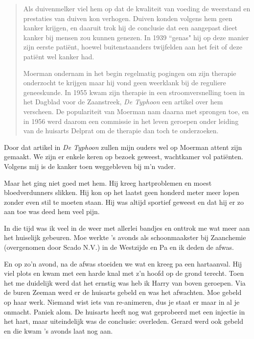 \documentclass[10pt,twoside, openright]{memoir}
\begin{document}
\begin{quote}
Als duivenmelker viel hem op dat de kwaliteit van voeding de weerstand en prestaties van duiven kon verhogen. Duiven konden volgens hem geen kanker krijgen, en daaruit trok hij de conclusie dat een aangepast dieet kanker bij mensen zou kunnen genezen. In 1939 ``genas" hij op deze manier zijn eerste patiënt, hoewel buitenstaanders twijfelden aan het feit of deze patiënt wel kanker had. 

Moerman ondernam in het begin regelmatig pogingen om zijn therapie onderzocht te krijgen maar hij vond geen weerklank bij de reguliere geneeskunde. In 1955 kwam zijn therapie in een stroomversnelling toen in het Dagblad voor de Zaanstreek, \emph{De Typhoon} een artikel over hem verscheen. De populariteit van Moerman nam daarna met sprongen toe, en in 1956 werd daarom een commissie in het leven geroepen onder leiding van de huisarts Delprat om de therapie dan toch te onderzoeken.
\end{quote}

Door dat artikel in \emph{De Typhoon} zullen mijn ouders wel op Moerman attent zijn gemaakt. We zijn er enkele keren op bezoek geweest, wachtkamer vol patiënten. Volgens mij is de kanker toen weggebleven bij m’n vader. 

Maar het ging niet goed met hem. Hij kreeg hartproblemen en moest bloedverdunners slikken. Hij kon op het laatst geen honderd meter meer lopen zonder even stil te moeten staan. Hij was altijd sportief geweest en dat hij er zo aan toe was deed hem veel pijn.

In die tijd was ik veel in de weer met allerlei bandjes en onttrok me wat meer aan het huiselijk gebeuren. Moe werkte ’s avonds als schoonmaakster bij Zaanchemie (overgenomen door Scado N.V.) in de Westzijde en Pa en ik deden de afwas. 

En op zo’n avond, na de afwas stoeiden we wat en kreeg pa een hartaanval. Hij viel plots en kwam met een harde knal met z’n hoofd op de grond terecht. Toen het me duidelijk werd dat het ernstig was heb ik Harry van boven geroepen. Via de buren Zeeman werd er de huisarts gebeld en was het afwachten. Moe gebeld op haar werk. Niemand wist iets van re-animeren, dus je staat er maar in al je onmacht. Paniek alom. De huisarts heeft nog wat geprobeerd met een injectie in het hart, maar uiteindelijk was de conclusie: overleden. Gerard werd ook gebeld en die kwam ’s avonds laat nog aan. 
\end{document}
